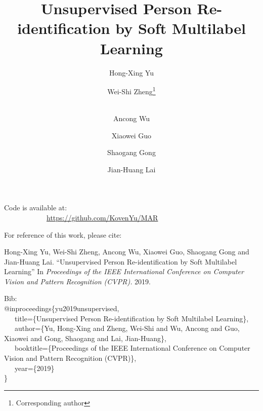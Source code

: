 \documentclass[10pt,twocolumn,letterpaper]{article}
\newcommand{\Koven}{\color{black}}
\newcommand{\erhao}{\fontsize{21pt}{\baselineskip}\selectfont}
\begin{document}
{\onecolumn

\noindent \textbf{\erhao{Unsupervised Person Re-identification by Soft Multilabel Learning}}

\vspace{2cm}


\vspace{2cm}

\noindent Code is available at: \\
\ \ \ \ \ \ \ \ \ \ \ \ \url{https://github.com/KovenYu/MAR}

\vspace{1cm}

\noindent For reference of this work, please cite:

\vspace{1cm}
\noindent Hong-Xing Yu, Wei-Shi Zheng, Ancong Wu, Xiaowei Guo, Shaogang Gong and Jian-Huang Lai.
``Unsupervised Person Re-identification by Soft Multilabel Learning''
In \emph{Proceedings of the IEEE International Conference on Computer Vision and Pattern Recognition (CVPR).} 2019.

\vspace{1cm}

\noindent Bib:\\
\noindent
@inproceedings\{yu2019unsupervised,\\
\ \ \   title=\{Unsupervised Person Re-identification by Soft Multilabel Learning\},\\
\ \ \  author=\{Yu, Hong-Xing and Zheng, Wei-Shi and Wu, Ancong and Guo, Xiaowei and Gong, Shaogang and Lai, Jian-Huang\},\\
\ \ \  booktitle=\{Proceedings of the IEEE International Conference on Computer Vision and Pattern Recognition (CVPR)\},\\
\ \ \  year=\{2019\}\\
\}
}

\restoregeometry

\title{Unsupervised Person Re-identification
by {\Koven Soft Multilabel Learning}}




\author[ ]{\vspace{-0.9cm}Hong-Xing Yu}
\author[ ]{Wei-Shi Zheng\thanks{Corresponding author}}
\author[ ]{\\Ancong Wu}
\author[ ]{Xiaowei Guo}
\author[ ]{Shaogang Gong}
\author[ ]{Jian-Huang Lai\vspace{0cm}}
\end{document}
